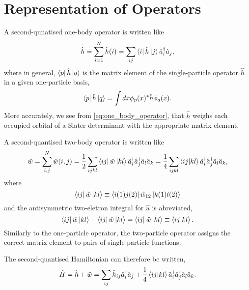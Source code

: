 \section{Representation of Operators}
    
    A second-qunatised one-body operator is written like
    \begin{equation}
        \label{eq:one_body_operator}
        \hat{h} = \sum_{i=1}^N \hat{h}(i) 
        = \sum_{ij} \bra{i} \hat{h} \ket{j}\hat{a}_i^\dagger \hat{a}_j,
    \end{equation}
    where in general, $\bra{p} \hat{h} \ket{q}$ is the matrix element of the single-particle
    operator $\hat{h}$ in a given one-particle basis,
    \begin{equation}
        \bra{p} \hat{h} \ket{q} = \int dx \phi_p(x)^* \hat{h} \phi_q(x).
    \end{equation}
    More accurately, we see from \autoref{eq:one_body_operator}, that $\hat{h}$
    weighs each occupied orbital of a Slater determinant with the appropriate 
    matrix element. 

    A second-quantised two-body operator is written like
    \begin{equation}
        \hat{w} = \sum_{i, j}^N\hat{w}(i,j) 
        = \frac{1}{2} \sum_{ijkl} \bra{ij}\hat{w}\ket{kl} 
            \hat{a}_i^\dagger \hat{a}_j^\dagger \hat{a}_l \hat{a}_k
        = \frac{1}{4} \sum_{ijkl} \bra{ij}  \ket{kl} 
            \hat{a}_i^\dagger \hat{a}_j^\dagger \hat{a}_l \hat{a}_k,
    \end{equation}
    where 
    \begin{equation}
        \bra{ij}\hat{w} \ket{kl} \equiv \bra{i(1)j(2)} \hat{w}_{12} \ket{k(1)l(2)}
    \end{equation} 
    and the antisymmetric two-eletron integral for $\hat{u}$ is abreviated,
    \begin{equation}
        \bra{ij} \hat{w}\ket{kl} - \bra{ij}\hat{w} \ket{kl} 
        = \bra{ij}\hat{w} \ket{kl} \equiv \bra{ij} \ket{kl}.
    \end{equation}
    Similarly to the one-particle operator, the two-particle operator assigns
    the correct matrix element to pairs of single particle functions.

    The second-quantised Hamiltonian can therefore be written,
    \begin{equation}
        \label{eq:second_quant_hamiltionian}
        \hat{H} = \hat{h} + \hat{w} 
        = \sum_{ij} \hat{h}_{ij}\hat{a}^\dagger_i \hat{a}_j
            + \frac{1}{4} \bra{ij}\ket{kl} 
            \hat{a}^\dagger_i \hat{a}^\dagger_j \hat{a}_l \hat{a}_k.
    \end{equation}

